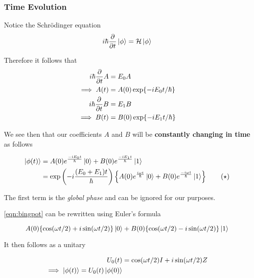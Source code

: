 \documentclass[reprint, amsmath,amssymb, aps]{revtex4-2}
\begin{document}
        \subsubsection{Time Evolution}
            Notice the Schr{\"o}dinger equation
            \begin{equation}
                i\hbar\pdv{}{t}\ket{\phi} = \mathcal{H}\ket{\phi}
            \end{equation}

            Therefore it follows that 
            \begin{align*}
                i\hbar\pdv{}{t} A &= E_0 A \\
                \implies A(t) &= A(0)\exp{-iE_0 t / \hbar} \\
                i\hbar\pdv{}{t} B &= E_1 B \\
                \implies B(t) &= B(0)\exp{-iE_1 t / \hbar}
            \end{align*}

            We see then that our coefficients $A$ and $B$ will be \textbf{constantly changing in time} as follows

            \begin{align*}
                \ket{\phi(t)} &= A(0)e^{\frac{-i E_0 t}{\hbar}}\ket{0} + B(0)e^{\frac{-i E_1 t}{\hbar}}\ket{1} \\
                &= \exp\left(-i\frac{(E_0 + E_1)t}{\hbar}\right)\left\{A(0)e^{\frac{i \omega t}{\hbar}}\ket{0} + B(0)e^{\frac{-i\omega t}{\hbar}}\ket{1}\right\} \tag{$\star$}\label{eqn:bingpot}
            \end{align*}

            The first term is the \textit{global phase} and can be ignored for our purposes.

            \eqref{eqn:bingpot} can be rewritten using Euler's formula

            \begin{equation*}
                A(0)\{\cos(\omega t/2) + i\sin(\omega t/2)\}\ket{0} + B(0)\{\cos(\omega t/2) - i\sin(\omega t/2)\}\ket{1}
            \end{equation*}

            It then follows as a unitary

            \begin{align*}
                U_0(t) &= \cos(\omega t/2)I + i\sin(\omega t / 2) Z \\
                \implies \ket{\phi(t)} = U_0 (t)\ket{\phi(0)}
            \end{align*}
\end{document}
